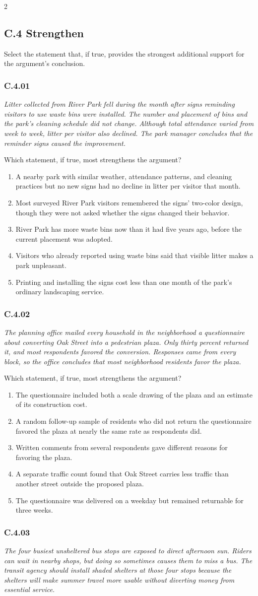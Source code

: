 \documentclass[10pt]{extarticle}
\newcommand{\choice}[1]{\item #1}
\newcommand{\bankitem}[1]{\subsubsection*{#1}}
\begin{document}
\begin{multicols}{2}
\subsection*{C.4 Strengthen}
Select the statement that, if true, provides the strongest additional support for the argument's conclusion.
\bankitem{C.4.01}
\emph{Litter collected from River Park fell during the month after signs reminding visitors to use waste bins were installed. The number and placement of bins and the park's cleaning schedule did not change. Although total attendance varied from week to week, litter per visitor also declined. The park manager concludes that the reminder signs caused the improvement.}

Which statement, if true, most strengthens the argument?
\begin{enumerate}[label=(\alph*)]
  \choice{A nearby park with similar weather, attendance patterns, and cleaning practices but no new signs had no decline in litter per visitor that month.}
  \choice{Most surveyed River Park visitors remembered the signs' two-color design, though they were not asked whether the signs changed their behavior.}
  \choice{River Park has more waste bins now than it had five years ago, before the current placement was adopted.}
  \choice{Visitors who already reported using waste bins said that visible litter makes a park unpleasant.}
  \choice{Printing and installing the signs cost less than one month of the park's ordinary landscaping service.}
\end{enumerate}
\bankitem{C.4.02}
\emph{The planning office mailed every household in the neighborhood a questionnaire about converting Oak Street into a pedestrian plaza. Only thirty percent returned it, and most respondents favored the conversion. Responses came from every block, so the office concludes that most neighborhood residents favor the plaza.}

Which statement, if true, most strengthens the argument?
\begin{enumerate}[label=(\alph*)]
  \choice{The questionnaire included both a scale drawing of the plaza and an estimate of its construction cost.}
  \choice{A random follow-up sample of residents who did not return the questionnaire favored the plaza at nearly the same rate as respondents did.}
  \choice{Written comments from several respondents gave different reasons for favoring the plaza.}
  \choice{A separate traffic count found that Oak Street carries less traffic than another street outside the proposed plaza.}
  \choice{The questionnaire was delivered on a weekday but remained returnable for three weeks.}
\end{enumerate}
\bankitem{C.4.03}
\emph{The four busiest unsheltered bus stops are exposed to direct afternoon sun. Riders can wait in nearby shops, but doing so sometimes causes them to miss a bus. The transit agency should install shaded shelters at those four stops because the shelters will make summer travel more usable without diverting money from essential service.}


\end{multicols}
\end{document}
